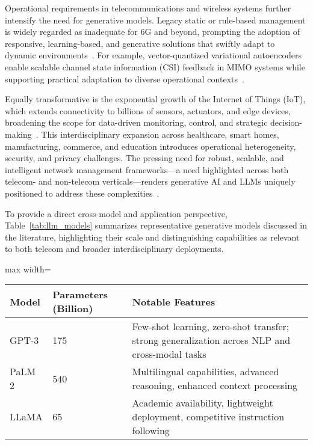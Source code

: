 \documentclass[sigconf]{acmart}
\begin{document}
Operational requirements in telecommunications and wireless systems further intensify the need for generative models. Legacy static or rule-based management is widely regarded as inadequate for 6G and beyond, prompting the adoption of responsive, learning-based, and generative solutions that swiftly adapt to dynamic environments~\cite{ref13,ref21,ref26,ref46,ref49}. For example, vector-quantized variational autoencoders enable scalable channel state information (CSI) feedback in MIMO systems while supporting practical adaptation to diverse operational contexts~\cite{ref13}.

Equally transformative is the exponential growth of the Internet of Things (IoT), which extends connectivity to billions of sensors, actuators, and edge devices, broadening the scope for data-driven monitoring, control, and strategic decision-making~\cite{ref45}. This interdisciplinary expansion across healthcare, smart homes, manufacturing, commerce, and education introduces operational heterogeneity, security, and privacy challenges. The pressing need for robust, scalable, and intelligent network management frameworks---a need highlighted across both telecom- and non-telecom verticals---renders generative AI and LLMs uniquely positioned to address these complexities~\cite{ref45,ref26}.

To provide a direct cross-model and application perspective, Table~\ref{tab:llm_models} summarizes representative generative models discussed in the literature, highlighting their scale and distinguishing capabilities as relevant to both telecom and broader interdisciplinary deployments.

\begin{table*}[htbp]
\centering
\caption{Representative Large Language and Generative Models: Scale and Notable Features~\cite{ref7}}
\label{tab:llm_models}
\begin{adjustbox}{max width=\textwidth}
\begin{tabular}{@{}lll@{}}
\toprule
\textbf{Model} & \textbf{Parameters (Billion)} & \textbf{Notable Features} \\
\midrule
GPT-3 & 175 & Few-shot learning, zero-shot transfer; strong generalization across NLP and cross-modal tasks \\
PaLM 2 & 540 & Multilingual capabilities, advanced reasoning, enhanced context processing \\
LLaMA & 65 & Academic availability, lightweight deployment, competitive instruction following \\
\bottomrule
\end{tabular}
\end{adjustbox}
\end{table*}
\end{document}
